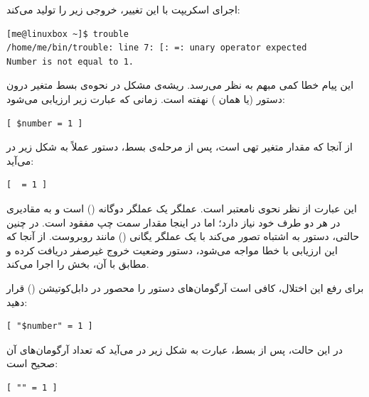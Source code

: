 اجرای اسکریپت با این تغییر، خروجی زیر را تولید می‌کند:

\begin{latin}
\begin{lstlisting}
[me@linuxbox ~]$ trouble
/home/me/bin/trouble: line 7: [: =: unary operator expected
Number is not equal to 1.
\end{lstlisting}
\end{latin}

این پیام خطا کمی مبهم به نظر می‌رسد. ریشه‌ی مشکل در نحوه‌ی بسط متغیر  درون دستور  (یا همان \cmd{]}) نهفته است. زمانی که عبارت زیر ارزیابی می‌شود:

\begin{latin}
\begin{lstlisting}
[ $number = 1 ]
\end{lstlisting}
\end{latin}

از آنجا که مقدار متغیر تهی است، پس از مرحله‌ی بسط، دستور عملاً به شکل زیر در می‌آید:

\begin{latin}
\begin{lstlisting}
[  = 1 ]
\end{lstlisting}
\end{latin}

این عبارت از نظر نحوی نامعتبر است. عملگر \cmd{=} یک عملگر دوگانه () است و به مقادیری در هر دو طرف خود نیاز دارد؛ اما در اینجا مقدار سمت چپ مفقود است. در چنین حالتی، دستور  به اشتباه تصور می‌کند با یک عملگر یگانی () مانند  روبروست. از آنجا که این ارزیابی با خطا مواجه می‌شود، دستور  وضعیت خروج غیرصفر دریافت کرده و مطابق با آن، بخش  را اجرا می‌کند.

برای رفع این اختلال، کافی است آرگومان‌های دستور  را محصور در دابل‌کوتیشن () قرار دهید:

\begin{latin}
\begin{lstlisting}
[ "$number" = 1 ]
\end{lstlisting}
\end{latin}

در این حالت، پس از بسط، عبارت به شکل زیر در می‌آید که تعداد آرگومان‌های آن صحیح است:

\begin{latin}
\begin{lstlisting}
[ "" = 1 ]
\end{lstlisting}
\end{latin}

